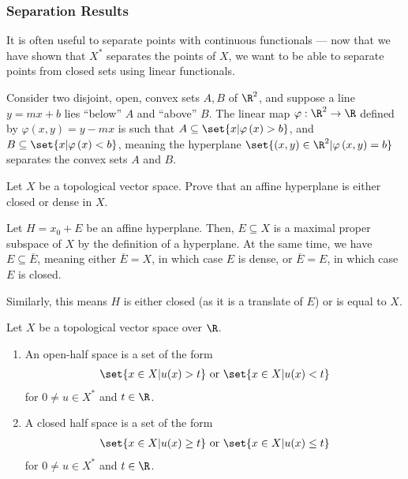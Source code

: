 \documentclass[10pt]{mypackage}
\begin{document}
\subsubsection{Separation Results}%
It is often useful to separate points with continuous functionals --- now that we have shown that $X^{\ast}$ separates the points of $X$, we want to be able to separate points from closed sets using linear functionals.\newline

Consider two disjoint, open, convex sets $A,B$ of $\R^2$, and suppose a line $y = mx + b$ lies ``below'' $A$ and ``above'' $B$. The linear map $\varphi: \R^2\rightarrow \R$ defined by $\varphi\left(x,y\right) = y-mx$ is such that $A\subseteq \set{x | \varphi\left(x\right) > b}$, and $B\subseteq \set{x | \varphi\left(x\right) < b}$, meaning the hyperplane $\set{\left(x,y\right)\in \R^2 | \varphi\left(x,y\right) = b}$ separates the convex sets $A$ and $B$.
\begin{exercise}
  Let $X$ be a topological vector space. Prove that an affine hyperplane is either closed or dense in $X$.
\end{exercise}
\begin{solution}
  Let $H = x_0 + E$ be an affine hyperplane. Then, $E\subseteq X$ is a maximal proper subspace of $X$ by the definition of a hyperplane. At the same time, we have $E\subseteq \overline{E}$, meaning either $\overline{E} = X$, in which case $E$ is dense, or $\overline{E} = E$, in which case $E$ is closed.\newline

  Similarly, this means $H$ is either closed (as it is a translate of $E$) or is equal to $X$.
\end{solution}
\begin{definition}
  Let $X$ be a topological vector space over $\R$.
  \begin{enumerate}[(1)]
    \item An open-half space is a set of the form
      \begin{align*}
        \set{x\in X | u(x) > t}\text{ or }\set{x\in X | u(x) < t}
      \end{align*}
      for $0\neq u\in X^{\ast}$ and $t\in \R$.
    \item A closed half space is a set of the form
      \begin{align*}
        \set{x\in X | u(x) \geq t}\text{ or }\set{x\in X | u(x) \leq t}
      \end{align*}
      for $0\neq u\in X^{\ast}$ and $t\in \R$.
  \end{enumerate}
\end{definition}
\end{document}
